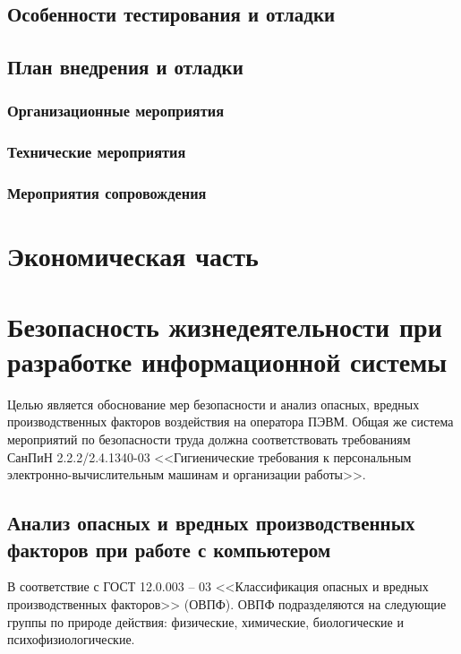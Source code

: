\documentclass[utf8,usehyperref,12pt]{G7-32}
\begin{document}
\section{Особенности тестирования и отладки}
\section{План внедрения и отладки}
\subsection{Организационные мероприятия}
\subsection{Технические мероприятия}
\subsection{Мероприятия сопровождения}

\chapter{Экономическая часть}
\chapter{Безопасность жизнедеятельности при разработке информационной системы}
Целью является обоснование мер безопасности и анализ опасных, вредных производственных факторов воздействия на оператора ПЭВМ.
Общая же система мероприятий по безопасности труда должна соответствовать требованиям СанПиН 2.2.2/2.4.1340-03 <<Гигиенические требования к персональным электронно-вычислительным машинам и организации работы>>. 

\section{Анализ опасных и вредных производственных факторов при работе с компьютером}
\label{safety_analysis}
В соответствие с ГОСТ 12.0.003 – 03 <<Классификация опасных и вредных производственных факторов>> (ОВПФ). ОВПФ подразделяются на следующие группы по природе действия: физические, химические, биологические и психофизиологические.
\end{document}
